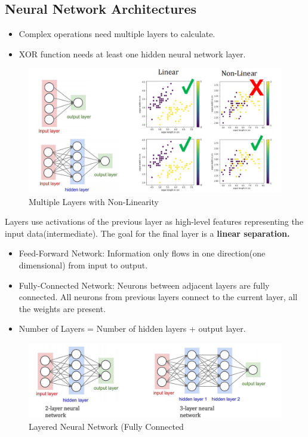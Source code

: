 \documentclass[11pt, english]{article}
\begin{document}
\subsection{Neural Network Architectures}
\begin{itemize}
    \item Complex operations need multiple layers to calculate.
    \item XOR function needs at least one hidden neural network layer. 
\end{itemize}
 \begin{figure}[H]
     \centering
     \includegraphics[width=0.7\linewidth]{Screenshot 2025-01-14 at 7.49.26 PM.png}
     \caption{Multiple Layers with Non-Linearity}
     \label{fig:enter-label}
 \end{figure}
 Layers use activations of the previous layer as high-level features representing the input data(intermediate).
 The goal for the final layer is a\textbf{ linear separation.}
 \begin{itemize}
     \item Feed-Forward Network: Information only flows in one direction(one dimensional) from input to output.
     \item Fully-Connected Network: Neurons between adjacent layers are fully connected. All neurons from previous layers connect to the current layer, all the weights are present.
     \item Number of Layers = Number of hidden layers + output layer.
 \end{itemize}
 \begin{figure}[H]
     \centering
     \includegraphics[width=0.7\linewidth]{Screenshot 2025-01-14 at 7.55.37 PM.png}
     \caption{Layered Neural Network (Fully Connected}
     \label{fig:enter-label}
 \end{figure}
\end{document}

